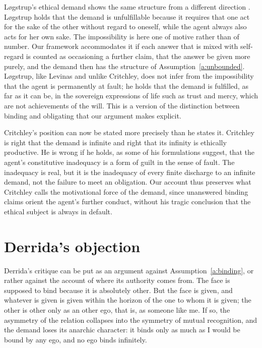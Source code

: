 \documentclass{situationist-preprint}
\begin{document}
Løgstrup's ethical demand shows the same structure from a different direction \citep{Logstrup1956}. Løgstrup holds that the demand is unfulfillable because it requires that one act for the sake of the other without regard to oneself, while the agent always also acts for her own sake. The impossibility is here one of motive rather than of number. Our framework accommodates it if each answer that is mixed with self-regard is counted as occasioning a further claim, that the answer be given more purely, and the demand then has the structure of Assumption~\ref{a:unbounded}. Løgstrup, like Levinas and unlike Critchley, does not infer from the impossibility that the agent is permanently at fault; he holds that the demand is fulfilled, as far as it can be, in the sovereign expressions of life such as trust and mercy, which are not achievements of the will. This is a version of the distinction between binding and obligating that our argument makes explicit.

Critchley's position can now be stated more precisely than he states it. Critchley is right that the demand is infinite and right that its infinity is ethically productive. He is wrong if he holds, as some of his formulations suggest, that the agent's constitutive inadequacy is a form of guilt in the sense of fault. The inadequacy is real, but it is the inadequacy of every finite discharge to an infinite demand, not the failure to meet an obligation. Our account thus preserves what Critchley calls the motivational force of the demand, since unanswered binding claims orient the agent's further conduct, without his tragic conclusion that the ethical subject is always in default.

\section{Derrida's objection}\label{s:derrida}

Derrida's critique can be put as an argument against Assumption~\ref{a:binding}, or rather against the account of where its authority comes from. The face is supposed to bind because it is absolutely other. But the face is given, and whatever is given is given within the horizon of the one to whom it is given; the other is other only as an other ego, that is, as someone like me. If so, the asymmetry of the relation collapses into the symmetry of mutual recognition, and the demand loses its anarchic character: it binds only as much as I would be bound by any ego, and no ego binds infinitely.
\end{document}
